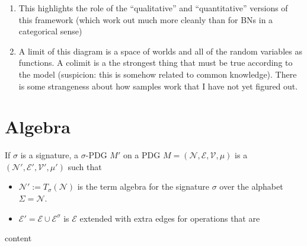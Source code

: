 \documentclass[letterpaper]{article} %
\theoremstyle{plain}
\theoremstyle{definition}
\theoremstyle{remark}
\newcommand{\Ed}{\mathcal E}
\begin{document}
{\begin{vcat}
\begin{enumerate}
		\item This highlights the role of the ``qualitative'' and ``quantitative'' versions of this framework (which work out much more cleanly than for BNs in a categorical sense)
		
		\item A limit of this diagram is a space of worlds and all of the random variables as functions. A colimit is a the strongest thing that must be true according to the model (suspicion: this is somehow related to common knowledge). There is some strangeness about how samples work that I have not yet figured out.
	\end{enumerate}
	
	
	\section{Algebra}\label{sec:algebra}
	\begin{defn}
		If $\sigma$ is a signature, a $\sigma$-PDG $M'$ on a PDG $M=(\mathcal N, \Ed, \mathcal V, \mu)$ is a \modelname\ $(\mathcal N', \Ed', \mathcal V', \mu')$ such that
		\begin{itemize}
			\item $\mathcal N':= T_\sigma(\mathcal N)$ is the term algebra for the signature $\sigma$ over the alphabet $\Sigma = \mathcal N$.
			\item $\Ed' = \Ed \cup \Ed^\sigma$ is $\Ed$ extended with extra edges for operations that are 
		\end{itemize}
	\end{defn}
	
	\begin{example}
		content
	\end{example}		
\end{vcat}

}
\end{document}
